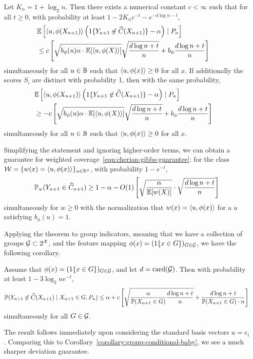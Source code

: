 \documentclass[11pt]{article}
\newcommand{\radphi}{b_{\phi}}
\newcommand{\scorerv}{S}
\begin{document}
\begin{theorem}
  \label{theorem:one-sided-sharp}
  Let $K_n = 1 + \log_2 n$.
  Then there exists a numerical constant $c < \infty$ such that
  for all $t \ge 0$,
  with probability at least $1 - 2 K_n e^{-t} - e^{-d \log n - t}$,
  \begin{align*}
    \lefteqn{\E\left[\<u, \phi(X_{n+1})\>
      \left(\indics{Y_{n + 1} \not \in \what{C}(X_{n+1})}
      - \alpha\right)
      \mid P_n \right]} \\
    & \le c \left[\sqrt{\radphi(u) \alpha \cdot \E[\<u, \phi(X)\>]}
      \sqrt{\frac{d \log n + t}{n}}
      + \radphi \frac{d \log n + t}{n}\right]
  \end{align*}
  simultaneously for all $u \in \mathbb{B}$ such that
  $\langle u, \phi(x)\rangle \ge 0$ for all $x$.
  If additionally the scores $\scorerv_i$ are distinct
  with probability 1, then with the same probability,
  \begin{align*}
    \lefteqn{\E\left[\<u, \phi(X_{n+1})\>
      \left(\indics{Y_{n + 1} \not \in \what{C}(X_{n+1})}
      - \alpha\right)
      \mid P_n \right]} \\
    & \ge - c \left[\sqrt{\radphi(u) \alpha \cdot \E[\<u, \phi(X)\>]}
      \sqrt{\frac{d \log n + t}{n}}
      + \radphi \frac{d \log n + t}{n}\right]
  \end{align*}
  simultaneously for all $u \in \mathbb{B}$ such that
  $\langle u, \phi(x)\rangle \ge 0$ for all $x$.
\end{theorem}
\noindent
Simplifying the statement and ignoring higher-order terms, we can obtain a
guarantee for weighted coverage~\eqref{eqn:cherian-gibbs-guarantee}: for the
class $\mathcal{W} = \{w(x) = \langle u, \phi(x)\rangle\}_{u \in \mathbb{R}^d}$, with probability $1
- e^{-t}$,
\begin{equation*}
  \mathbb{P}_w(Y_{n + 1} \in \widehat{C}_{n + 1})
  \ge 1 - \alpha - O(1) \left[\sqrt{\frac{\alpha}{\mathbb{E}[w(X)]}}
    \cdot \sqrt{\frac{d \log n + t}{n}}\right]
\end{equation*}
simultaneously for $w \ge 0$
with the normalization that $w(x) = \langle u, \phi(x)\rangle$ for
a $u$ satisfying $\radphi(u) = 1$.

Applying the theorem to group indicators, meaning
that we have a collection of groups $\mathcal{G} \subset 2^{\mathcal{X}}$, and
the feature mapping $\phi(x) = (1\!\left\{x \in G\right\})_{G \in \mathcal{G}}$,
we have the following corollary.
\begin{corollary}
  Assume that $\phi(x) = (1\!\left\{x \in G\right\})_{G \in \mathcal{G}}$,
  and let $d = \mathop{\rm card}(\mathcal{G})$.
  Then with probability at least
  $1 - 3 \log_2 n e^{-t}$,
  \begin{equation*}
    \mathbb{P}(Y_{n + 1} \not \in \widehat{C}(X_{n + 1}) \mid X_{n + 1} \in G,
    P_n)
    \le \alpha +
    c \left[\sqrt{\frac{\alpha}{\mathbb{P}(X_{n + 1} \in G)}
        \frac{d \log n + t}{n}} +
      \frac{d \log n + t}{\mathbb{P}(X_{n + 1} \in G) \cdot n} \right]
  \end{equation*}
  simultaneously for all $G \in \mathcal{G}$.
\end{corollary}
\noindent
The result follows immediately upon considering the standard basis
vectors $u = e_i$.
%
Comparing this to Corollary~\ref{corollary:group-conditional-baby},
we see a much sharper deviation guarantee.
\end{document}
